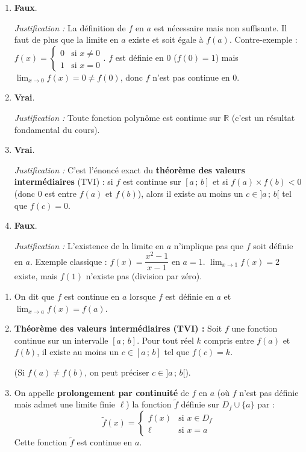 \documentclass[11pt]{article}
\begin{document}
\begin{corrige}
\begin{enumerate}
\item \textbf{Faux}. \par
\emph{Justification :} La définition de $f$ en $a$ est nécessaire mais non suffisante. Il faut de plus que la limite en $a$ existe et soit égale à $f(a)$. Contre-exemple : $f(x) = \begin{cases} 0 & \text{si } x \neq 0 \\ 1 & \text{si } x = 0 \end{cases}$. $f$ est définie en $0$ ($f(0)=1$) mais $\lim_{x\to 0}f(x)=0 \neq f(0)$, donc $f$ n'est pas continue en $0$.
\item \textbf{Vrai}. \par
\emph{Justification :} Toute fonction polynôme est continue sur $\mathbb{R}$ (c'est un résultat fondamental du cours).
\item \textbf{Vrai}. \par
\emph{Justification :} C'est l'énoncé exact du \textbf{théorème des valeurs intermédiaires} (TVI) : si $f$ est continue sur $[a\,;\,b]$ et si $f(a)\times f(b) < 0$ (donc $0$ est entre $f(a)$ et $f(b)$), alors il existe au moins un $c \in ]a\,;\,b[$ tel que $f(c)=0$.
\item \textbf{Faux}. \par
\emph{Justification :} L'existence de la limite en $a$ n'implique pas que $f$ soit définie en $a$. Exemple classique : $f(x) = \dfrac{x^2-1}{x-1}$ en $a=1$. $\lim_{x\to 1}f(x) = 2$ existe, mais $f(1)$ n'existe pas (division par zéro).
\end{enumerate}
\end{corrige}

\begin{corrige}
\begin{enumerate}
\item On dit que $f$ est continue en $a$ lorsque $f$ est définie en $a$ et $\displaystyle\lim_{x \to a} f(x) = \textbf{$f(a)$}$.
\item \textbf{Théorème des valeurs intermédiaires (TVI) :} Soit $f$ une fonction continue sur un intervalle $[a\,;\,b]$. Pour tout réel $k$ compris entre $f(a)$ et $f(b)$, il existe au moins un $c \in [a\,;\,b]$ tel que $f(c) = k$. \par
(Si $f(a) \neq f(b)$, on peut préciser $c \in ]a\,;\,b[$).
\item On appelle \textbf{prolongement par continuité} de $f$ en $a$ (où $f$ n'est pas définie mais admet une limite finie $\ell$) la fonction $\tilde{f}$ définie sur $D_f \cup \{a\}$ par :
\[
\tilde{f}(x) = \begin{cases} f(x) & \text{si } x \in D_f \\ \ell & \text{si } x = a \end{cases}
\]
Cette fonction $\tilde{f}$ est continue en $a$.
\end{enumerate}
\end{corrige}
\end{document}
